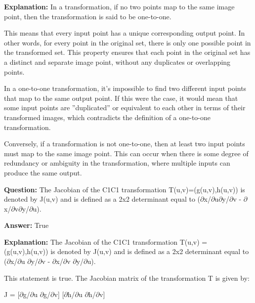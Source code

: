 \documentclass{article}
\begin{document}
                \textbf{Explanation:} In a transformation, if no two points map to the same image point, then the transformation is said to be one-to-one.

This means that every input point has a unique corresponding output point. In other words, for every point in the original set, there is only one possible point in the transformed set. This property ensures that each point in the original set has a distinct and separate image point, without any duplicates or overlapping points.

In a one-to-one transformation, it's impossible to find two different input points that map to the same output point. If this were the case, it would mean that some input points are ''duplicated'' or equivalent to each other in terms of their transformed images, which contradicts the definition of a one-to-one transformation.

Conversely, if a transformation is not one-to-one, then at least two input points must map to the same image point. This can occur when there is some degree of redundancy or ambiguity in the transformation, where multiple inputs can produce the same output.
                
                \vspace{0.5cm} 
        
            
                \textbf {Question:} The Jacobian of the C1C1 transformation T(u,v)=(g(u,v),h(u,v)) is denoted by J(u,v) and is defined as a 2x2 determinant equal to (\ensuremath{\partial}x/\ensuremath{\partial}u\ensuremath{\partial}y/\ensuremath{\partial}v - \ensuremath{\partial}x/\ensuremath{\partial}v\ensuremath{\partial}y/\ensuremath{\partial}u).
                
                \textbf{Answer:} True

                \textbf{Explanation:} The Jacobian of the C1C1 transformation T(u,v) = (g(u,v),h(u,v)) is denoted by J(u,v) and is defined as a 2x2 determinant equal to (\ensuremath{\partial}x/\ensuremath{\partial}u \ensuremath{\partial}y/\ensuremath{\partial}v - \ensuremath{\partial}x/\ensuremath{\partial}v \ensuremath{\partial}y/\ensuremath{\partial}u).

This statement is true. The Jacobian matrix of the transformation T is given by:

J = [\ensuremath{\partial}g/\ensuremath{\partial}u   \ensuremath{\partial}g/\ensuremath{\partial}v]
    [\ensuremath{\partial}h/\ensuremath{\partial}u   \ensuremath{\partial}h/\ensuremath{\partial}v]
\end{document}
